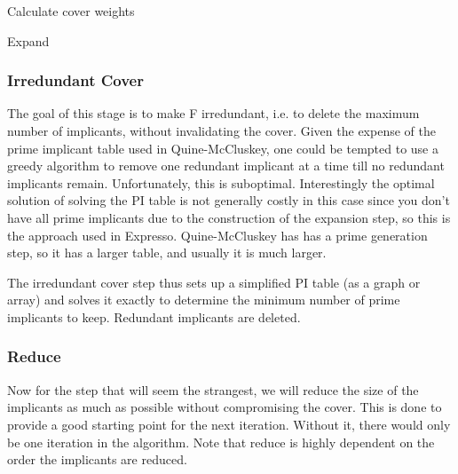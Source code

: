 \begin{algorithm}[H]
 
 Calculate cover weights
 \caption{Expand}
\end{algorithm}




\subsubsection{Irredundant Cover}

The goal of this stage is to make F irredundant, i.e. to delete the maximum number of implicants, without invalidating the cover.  Given the expense of the prime implicant table used in Quine-McCluskey, one could be tempted to use a greedy algorithm to remove one redundant implicant at a time till no redundant implicants remain.  Unfortunately, this is suboptimal.  Interestingly the optimal solution of solving the PI table is not generally costly in this case since you don't have all prime implicants due to the construction of the expansion step, so this is the approach used in Expresso.  Quine-McCluskey has has a prime generation step, so it has a larger table, and usually it is much larger.

The irredundant cover step thus sets up a simplified PI table (as a graph or array) and solves it exactly to determine the minimum number of prime implicants to keep.  Redundant implicants are deleted.





\subsubsection{Reduce}

Now for the step that will seem the strangest, we will reduce the size of the implicants as much as possible without compromising the cover.  This is done to provide a good starting point for the next iteration.  Without it, there would only be one iteration in the algorithm.  Note that reduce is highly dependent on the order the implicants are reduced.


